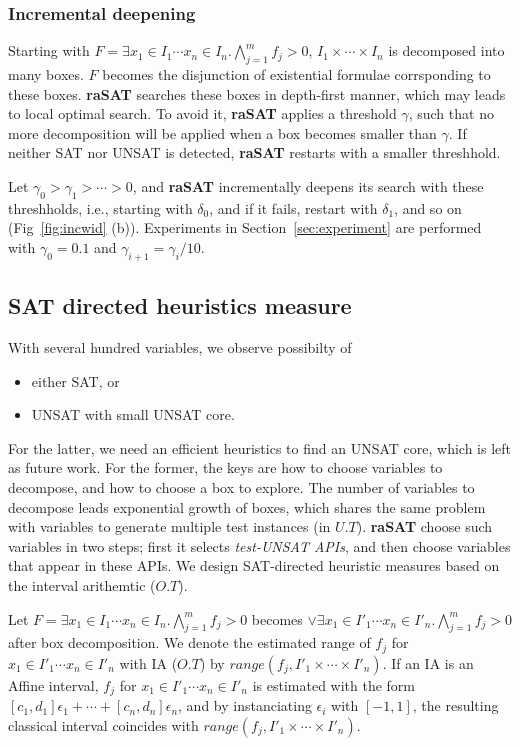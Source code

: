\documentclass[runningheads,a4paper,oribibl]{llncs}
\begin{document}
\subsubsection*{Incremental deepening}

Starting with $F = \exists x_1 \in I_1 \cdots x_n \in I_n. \bigwedge \limits_{j=1}^m f_j > 0$, 
$I_1 \times \cdots \times I_n$ is decomposed into many boxes. 
$F$ becomes the disjunction of existential formulae corrsponding to these boxes. 
{\bf raSAT} searches these boxes in depth-first manner, which may leads to local optimal search. 
To avoid it, {\bf raSAT} applies a threshold $\gamma$, such that no more decomposition will be 
applied when a box becomes smaller than $\gamma$. 
If neither SAT nor UNSAT is detected, {\bf raSAT} restarts with a smaller threshhold. 

Let $\gamma_0 > \gamma_1 > \cdots > 0$, and {\bf raSAT} incrementally deepens its search 
with these threshholds, i.e., starting with $\delta_0$, and if it fails, restart with $\delta_1$, 
and so on (Fig~\ref{fig:incwid} (b)). 
Experiments in Section~\ref{sec:experiment} are performed 
with $\gamma_0 = 0.1$ and $\gamma_{i+1} =  \gamma_i / 10$. 



\subsection{SAT directed heuristics measure}

With several hundred variables, we observe possibilty of 
\begin{itemize}
\item either SAT, or
\item UNSAT with small UNSAT core.
\end{itemize}
For the latter, we need an efficient heuristics to find an UNSAT core, which is left as future work. 
For the former, the keys are how to choose variables to decompose, and 
how to choose a box to explore. 
The number of variables to decompose leads exponential growth of boxes, which  
shares the same problem with variables to generate multiple test instances (in $U.T$). 
{\bf raSAT} choose such variables in two steps; first it selects {\em test-UNSAT APIs}, and
then choose variables that appear in these APIs. 
We design SAT-directed heuristic measures based on the interval arithemtic ($O.T$). 

Let $F = \exists x_1 \in I_1 \cdots x_n \in I_n. \bigwedge \limits_{j=1}^m f_j > 0$ 
becomes $\vee \exists x_1 \in I'_1 \cdots x_n \in I'_n. \bigwedge \limits_{j=1}^m f_j > 0$ 
after box decomposition. 
We denote the estimated range of $f_j$ for $x_1 \in I'_1 \cdots x_n \in I'_n$ with IA ($O.T$)
by $range(f_j, I'_1 \times \cdots \times I'_n)$. 
If an IA is an Affine interval, $f_j$ for $x_1 \in I'_1 \cdots x_n \in I'_n$ is estimated with 
the form $[c_1,d_1]\epsilon_1 + \cdots + [c_n,d_n]\epsilon_n$, 
and by instanciating $\epsilon_i$ with $[-1,1]$, 
the resulting classical interval coincides with $range(f_j, I'_1 \times \cdots \times I'_n)$. 
\end{document}
